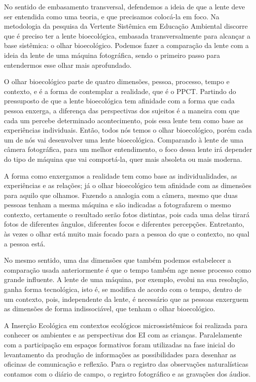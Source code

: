 \documentclass{textolivre}
\begin{document}
No sentido de embasamento transversal, defendemos a ideia de que a lente deve ser entendida como uma teoria, e que precisamos colocá-la em foco. Na metodologia da pesquisa da Vertente Sistêmica em Educação Ambiental \cite{piske2018b,piske2019} discorre que é preciso ter a lente bioecológica, embasada transversalmente para alcançar a base sistêmica: o olhar bioecológico. Podemos fazer a comparação da lente com a ideia da lente de uma máquina fotográfica, sendo o primeiro passo para entendermos esse olhar mais aprofundado.

O olhar bioecológico parte de quatro dimensões, pessoa, processo, tempo e contexto, e é a forma de contemplar a realidade, que é o PPCT. Partindo do pressuposto de que a lente bioecológica tem afinidade com a forma que cada pessoa enxerga, a diferença das perspectivas dos sujeitos é a maneira com que cada um percebe determinado acontecimento, pois essa lente tem como base as experiências individuais. Então, todos nós temos o olhar bioecológico, porém cada um de nós vai desenvolver uma lente bioecológica. Comparando à lente de uma câmera fotográfica, para um melhor entendimento, o foco dessa lente irá depender do tipo de máquina que vai comportá-la, quer mais absoleta ou mais moderna. 

A forma como enxergamos a realidade tem como base as individualidades, as experiências e as relações; já o olhar bioecológico tem afinidade com as dimensões para aquilo que olhamos. Fazendo a analogia com a câmera, mesmo que duas pessoas tenham a mesma máquina e são indicadas a fotografarem o mesmo contexto, certamente o resultado serão fotos distintas, pois cada uma delas tirará fotos de diferentes ângulos, diferentes focos e diferentes percepções. Entretanto, às vezes o olhar está muito mais focado para a pessoa do que o contexto, no qual a pessoa está.

No mesmo sentido, uma das dimensões que também podemos estabelecer a comparação usada anteriormente é que o tempo também age nesse processo como grande influente. A lente de uma máquina, por exemplo, evolui na sua resolução, ganha forma tecnológica, isto é, se modifica de acordo com o tempo, dentro de um contexto, pois, independente da lente, é necessário que as pessoas enxerguem as dimensões de forma indissociável, que tenham o olhar bioecológico.

A Inserção Ecológica em contextos ecológicos microssistêmicos foi realizada para conhecer os ambientes e as perspectivas dos EI com as crianças. Paralelamente com a participação em espaços formativos foram utilizadas na fase inicial do levantamento da produção de informações as possibilidades para desenhar as oficinas de comunicação e reflexão. Para o registro das observações naturalísticas contamos com o diário de campo, o registro fotográfico e as gravações dos áudios.
\end{document}
